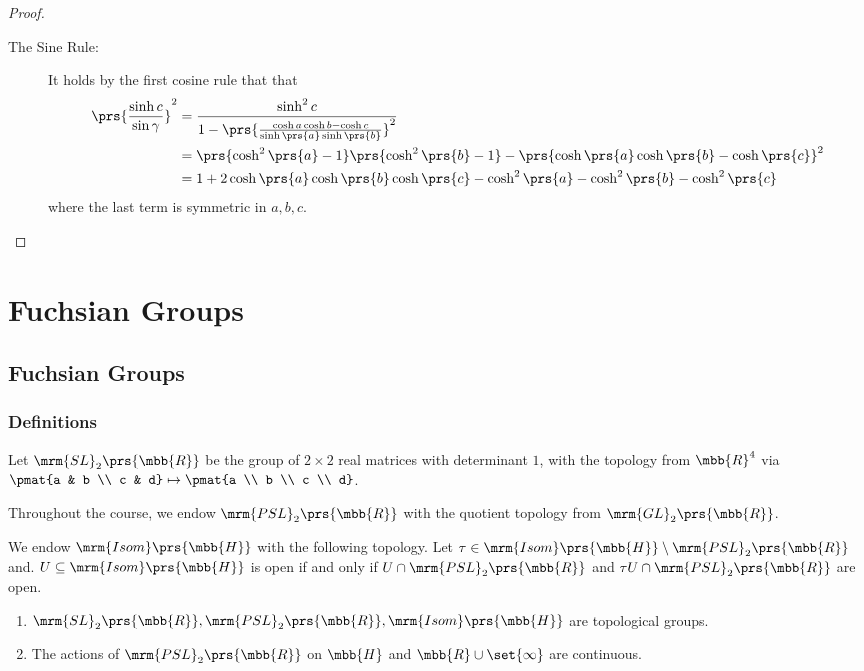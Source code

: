 \documentclass[10pt, twoside]{book}
\begin{document}
\begin{proof}
\begin{description}
\item[The Sine Rule:]
It holds by the first cosine rule that that
\begin{align*}
\prs{\frac{\sinh c}{\sin \gamma}}^2 &=
\frac{\sinh^2 c}{1 - \prs{\frac{\cosh a \cosh b - \cosh c}{\sinh \prs{a} \sinh\prs{b}}}^2}
\\&=
\prs{\cosh^2\prs{a} - 1}\prs{\cosh^2\prs{b} - 1} - \prs{\cosh\prs{a} \cosh\prs{b} - \cosh\prs{c}}^2
\\&= 1 + 2 \cosh\prs{a} \cosh\prs{b} \cosh\prs{c} - \cosh^2\prs{a} - \cosh^2\prs{b} - \cosh^2\prs{c}
\end{align*}
where the last term is symmetric in $a,b,c$.
\end{description}
\end{proof}

\chapter{Fuchsian Groups}

\section{Fuchsian Groups}

\subsection{Definitions}

\begin{definition}
Let $\mrm{SL}_2\prs{\mbb{R}}$ be the group of $2 \times 2$ real matrices with determinant $1$, with the topology from $\mbb{R}^4$ via $\pmat{a & b \\ c & d} \mapsto \pmat{a \\ b \\ c \\ d}$.
\end{definition}

Throughout the course, we endow $\mrm{PSL}_2\prs{\mbb{R}}$ with the quotient topology from $\mrm{GL}_2\prs{\mbb{R}}$.

We endow $\mrm{Isom}\prs{\mbb{H}}$ with the following topology.
Let $\tau \in \mrm{Isom}\prs{\mbb{H}} \setminus \mrm{PSL}_2\prs{\mbb{R}}$ and.
$U \subseteq \mrm{Isom}\prs{\mbb{H}}$ is open if and only if $U \cap \mrm{PSL}_2\prs{\mbb{R}}$ and $\tau U \cap \mrm{PSL}_2\prs{\mbb{R}}$ are open.

\begin{exercise}
\begin{enumerate}
\item
$\mrm{SL}_2\prs{\mbb{R}}, \mrm{PSL}_2\prs{\mbb{R}}, \mrm{Isom}\prs{\mbb{H}}$ are topological groups.
\item The actions of $\mrm{PSL}_2\prs{\mbb{R}}$ on $\mbb{H}$ and $\mbb{R} \cup \set{\infty}$ are continuous.
\end{enumerate}
\end{exercise}
\end{document}
